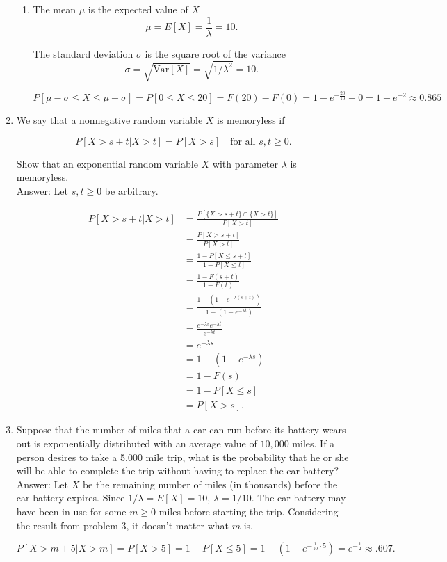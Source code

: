 \documentclass{article}
\begin{document}
\begin{enumerate}
\begin{enumerate}
\item  The mean $\mu$ is the expected value of $X$
$$
\mu = E[X] = \frac{1}{\lambda} = 10.$$

The standard deviation $\sigma$ is the square root of the variance 
$$\sigma = \sqrt{\text{Var}[X]} = \sqrt{1/\lambda^2} = 10.$$

$$
P[\mu - \sigma \leq X \leq \mu + \sigma] = P[0 \leq X \leq 20] = F(20) - F(0) = 1-e^{-\frac{20}{10}} - 0 = 1-e^{-2} \approx 0.865
$$
\end{enumerate}

\newpage
\item We say that a nonnegative random variable $X$ is memoryless if

$$P[X > s+t \vert X > t] = P[X > s] \quad \text{for all } s, t \geq 0.$$ 

Show that an exponential random variable $X$ with parameter $\lambda$ is memoryless.\\

Answer: Let $s,t \geq 0$ be arbitrary.

\begin{align*}
P[X > s+t \vert X > t] &= \frac{P[\{X > s+t\} \cap \{ X > t\}]}{P[X > t]} \\
&= \frac{P[X > s+t]}{P[X > t]} \\
&= \frac{1-P[ X \leq s+t]}{1 - P[X \leq t]} \\
&= \frac{1 - F(s+t)}{1-F(t)} \\
&= \frac{1 - (1 - e^{-\lambda(s+t)})}{1-(1-e^{-\lambda t})} \\
&= \frac{e^{-\lambda s}e^{-\lambda t}}{e^{-\lambda t}} \\
&= e^{-\lambda s} \\
&= 1-(1-e^{-\lambda s}) \\
&= 1 - F(s) \\
&= 1-P[X \leq s] \\
&= P[X > s] .
\end{align*}


\item
Suppose that the number of miles that a car can run before its battery wears out is exponentially distributed with an average value of $10,000$ miles. If a person desires to take a 5,000 mile trip, what is the probability that he or she will be able to complete the trip without having to replace the car battery?\\

Answer: Let $X$ be the remaining number of miles (in thousands) before the car battery expires. Since $1/ \lambda = E[X] = 10$, $\lambda = 1/10$. The car battery may have been in use for some $m \geq 0$ miles before starting the trip. Considering the result from problem 3, it doesn't matter what $m$ is.

$$
P[X > m + 5 \vert X > m] = P[X > 5] = 1-P[X \leq 5] = 1-(1-e^{-\frac{1}{10}\cdot 5}) = e^{-\frac{1}{2}} \approx .607.
$$

\end{enumerate}
\end{document}
